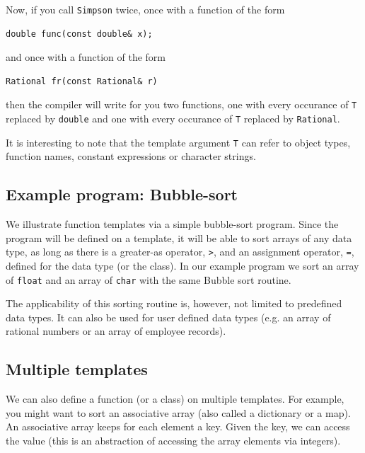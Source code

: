 Now, if you call \verb+Simpson+ twice, once with a function
of the form
{\small \begin{verbatim}
double func(const double& x);
\end{verbatim}}
\noindent
and once with a function of the form
{\small \begin{verbatim}
Rational fr(const Rational& r)
\end{verbatim}}
\noindent
then the compiler will write for you two functions, one with every occurance of
\verb+T+ replaced by \verb+double+ and one with every occurance of \verb+T+
replaced by \verb+Rational+.

It is interesting to note that the template argument \verb+T+ can refer to object types,
function names, constant expressions or character strings.

\subsection{Example program: Bubble-sort}
 

We illustrate function templates via a simple bubble-sort program. Since the
program will be defined on a template, it will be able to sort arrays of any
data type, as long as there is a greater-as operator, \verb+>+, and an assignment
operator, \verb+=+, defined for the data type (or the class). In
our example program we sort an array of \verb+float+ and an array of \verb+char+
with the same Bubble sort routine.

\noindent {\small }

The applicability of this sorting routine is, however, not limited to predefined
data types. It can also be used for user defined data types (e.g. an array of
rational numbers or an array of employee records).


\subsection{Multiple templates}

We can also define a function (or a class) on multiple templates. For example,
you might want to sort an associative array (also called a dictionary or a map).
An associative array keeps for each element a key. Given the key, we can access
the value (this is an abstraction of accessing the array elements via integers).

